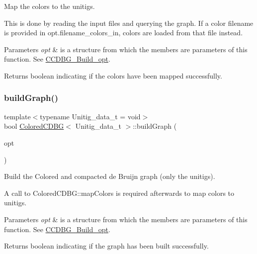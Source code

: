 Map the colors to the unitigs. 

This is done by reading the input files and querying the graph. If a color filename is provided in opt.\+filename\+\_\+colors\+\_\+in, colors are loaded from that file instead. 
\begin{DoxyParams}{Parameters}
{\em opt} & is a structure from which the members are parameters of this function. See \hyperlink{structCCDBG__Build__opt}{C\+C\+D\+B\+G\+\_\+\+Build\+\_\+opt}. \\
\hline
\end{DoxyParams}
\begin{DoxyReturn}{Returns}
boolean indicating if the colors have been mapped successfully. 
\end{DoxyReturn}
\mbox{\label{classColoredCDBG_a7213d0d20b4ee933af43993abf776d43}} 
\subsubsection{\texorpdfstring{build\+Graph()}{buildGraph()}}
{\footnotesize\ttfamily template$<$typename Unitig\+\_\+data\+\_\+t = void$>$ \\
bool \hyperlink{classColoredCDBG}{Colored\+C\+D\+BG}$<$ Unitig\+\_\+data\+\_\+t $>$\+::build\+Graph (\begin{DoxyParamCaption}\item[{const \hyperlink{structCCDBG__Build__opt}{C\+C\+D\+B\+G\+\_\+\+Build\+\_\+opt} \&}]{opt }\end{DoxyParamCaption})}



Build the Colored and compacted de Bruijn graph (only the unitigs). 

A call to Colored\+C\+D\+B\+G\+::map\+Colors is required afterwards to map colors to unitigs. 
\begin{DoxyParams}{Parameters}
{\em opt} & is a structure from which the members are parameters of this function. See \hyperlink{structCCDBG__Build__opt}{C\+C\+D\+B\+G\+\_\+\+Build\+\_\+opt}. \\
\hline
\end{DoxyParams}
\begin{DoxyReturn}{Returns}
boolean indicating if the graph has been built successfully. 
\end{DoxyReturn}
\mbox{\label{classColoredCDBG_addda923f3d4f213ffd3a572163c410f8}} 
